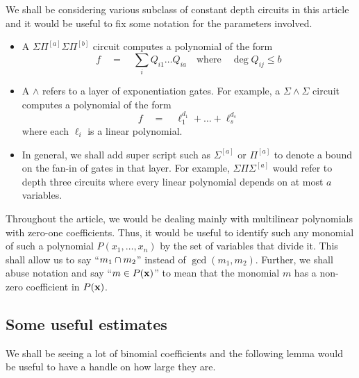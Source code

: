 \documentclass{beatcs}
\newcommand{\spaced}[1]{\quad#1\quad}
\newcommand{\SPSPfanin}[2]{\Sigma\Pi^{[#1]}\Sigma\Pi^{[#2]}}
\begin{document}
We shall be considering various subclass of constant depth circuits in this article and it would be useful to fix some notation for the parameters involved. 
\begin{itemize}
\item A $\SPSPfanin{a}{b}$ circuit computes a polynomial of the form 
\[
f \spaced{=} \sum_i Q_{i1}\dots Q_{ia} \spaced{\text{where}} \deg Q_{ij} \leq b
\]
\item A $\wedge$ refers to a layer of exponentiation gates. For example, a $\Sigma\!\wedge\!\Sigma$ circuit computes a polynomial of the form 
\[
f \quad = \quad \ell_1^{d_1} + \dots + \ell_s^{d_s}
\]
where each $\ell_i$ is a linear polynomial. 
\item In general, we shall add super script such as $\Sigma^{[a]}$ or $\Pi^{[a]}$ to denote a bound on the fan-in of gates in that layer. For example, $\Sigma\Pi\Sigma^{[a]}$ would refer to depth three circuits where every linear polynomial depends on at most $a$ variables. 
\end{itemize}

Throughout the article, we would be dealing mainly with multilinear polynomials with zero-one coefficients. Thus, it would be useful to identify such any monomial of such a polynomial $P(x_1,\dots, x_n)$ by the set of variables that divide it. This shall allow us to say ``$m_1 \cap m_2$'' instead of $\gcd(m_1,m_2)$. Further, we shall abuse notation and say ``$m\in P(\mathbf{x})$'' to mean that the monomial $m$ has a non-zero coefficient in $P(\mathbf{x})$. 

\subsection{Some useful estimates}

We shall be seeing a lot of binomial coefficients and the following lemma would be useful to have a handle on how large they are. 
\end{document}
